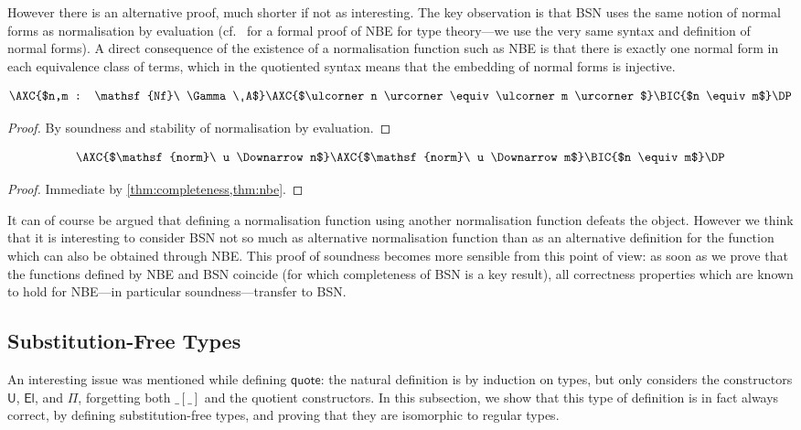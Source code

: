 \documentclass[a4paper,UKenglish,cleveref]{lipics-v2019}
\newcommand{\agdaSymb}[1]{\mathsf{#1}}
\newcommand{\Nf}{\agdaSymb{Nf}}
\newcommand{\q}{\agdaSymb{quote}}
\newcommand{\norm}{\agdaSymb{norm}}
\newcommand{\U}{\agdaSymb{U}}
\newcommand{\El}{\agdaSymb{El}}
\newcommand{\cul}{\ulcorner}
\newcommand{\cur}{\urcorner}
\newcommand{\Da}{\Downarrow}
\begin{document}
However there is an alternative proof, much shorter if not as interesting.
The key observation is that BSN uses the same notion of normal forms as
normalisation by evaluation (cf.~\cite{kaposi2016normalisation} for a formal
proof of NBE for type theory---we use the very same syntax and definition of
normal forms). A direct consequence of the existence of a normalisation function
such as NBE is that there is exactly one normal form in each equivalence class
of terms, which in the quotiented syntax means that the embedding of normal
forms is injective.
\begin{theorem}
  \label{thm:nbe}
  \[ \AXC{$n,m : \Nf\ \Gamma\ A$}\AXC{$\cul n \cur \equiv \cul m \cur$}\BIC{$n \equiv m$}\DP \]
\end{theorem}
\begin{proof}
  By soundness and stability of normalisation by evaluation.
\end{proof}

\begin{theorem}[Soundness]
  \label{thm:soundness}
  \[ \AXC{$\norm\ u \Da n$}\AXC{$\norm\ u \Da m$}\BIC{$n \equiv m$}\DP \]
\end{theorem}
\begin{proof}
  Immediate by \cref{thm:completeness,thm:nbe}.
\end{proof}

It can of course be argued that defining a normalisation function using another
normalisation function defeats the object. However we think that it is interesting
to consider BSN not so much as alternative normalisation function than as an
alternative definition for the function which can also be obtained through NBE.
This proof of soundness becomes more sensible from this point of view: as soon
as we prove that the functions defined by NBE and BSN coincide (for which
completeness of BSN is a key result), all correctness properties which are known
to hold for NBE---in particular soundness---transfer to BSN.

\subsection{Substitution-Free Types}
An interesting issue was mentioned while defining $\q$: the natural definition
is by induction on types, but only considers the constructors $\U$, $\El$, and
$\Pi$, forgetting both $\_[\_]$ and the quotient constructors. In this
subsection, we show that this type of definition is in fact always correct, by
defining substitution-free types, and proving that they are isomorphic to
regular types.
\end{document}
